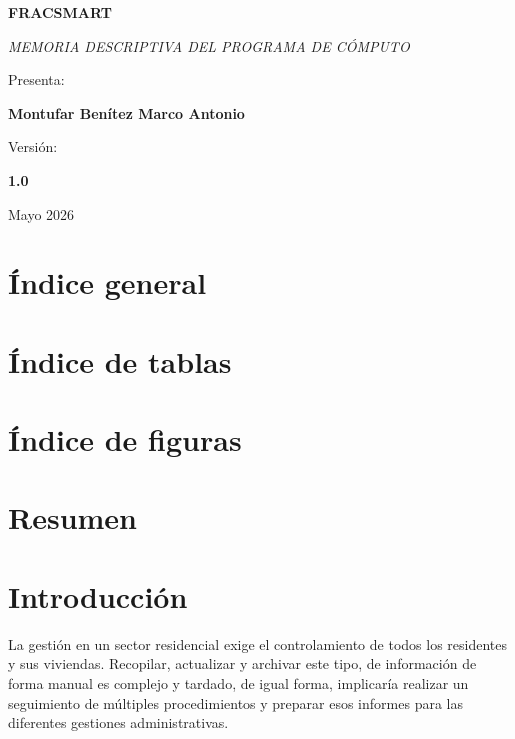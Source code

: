 \documentclass{article}
\begin{document}
    \BgThispage
    \begin{titlepage}
    \centering
    \vspace*{200px}
    {\scshape\Huge \textbf{FRACSMART} \par}
    \vspace{3cm}
    {\itshape\Large  MEMORIA DESCRIPTIVA DEL PROGRAMA DE CÓMPUTO\par}
    \vfill
    {\Large Presenta: \par}
    {\Large \textbf{Montufar Benítez Marco Antonio} \par}
    \vspace{1cm}
    {\Large Versión: \par}
    {\Large \textbf{1.0}\par}
    \vfill
    {\Large Mayo 2026 \par}
    \end{titlepage}


\newpage
\section*{Índice general}
\tableofcontents


\newpage
\section{Índice de tablas}
\listoftables


\newpage
\section{Índice de figuras}
\listoffigures


\newpage
\section{Resumen}
\quad \quad 


\newpage
\section{Introducción}
\quad\quad La gestión en un sector residencial exige el controlamiento de todos los residentes y sus viviendas. Recopilar, actualizar y archivar este tipo, de información de forma manual es complejo y tardado, de igual forma, implicaría realizar un seguimiento de múltiples procedimientos y preparar esos informes para las diferentes gestiones administrativas. \\
\end{document}
